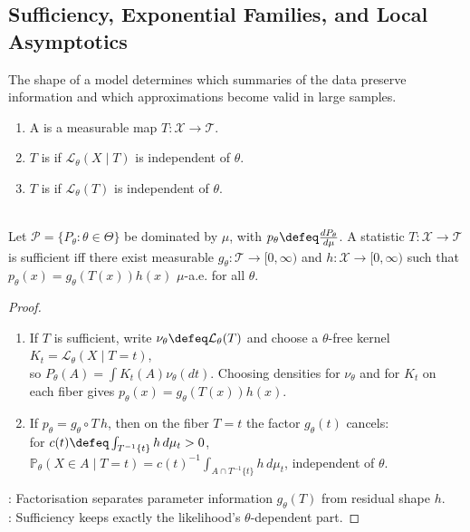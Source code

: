 \subsection{Sufficiency, Exponential Families, and Local Asymptotics}

The shape of a model determines which summaries of the data preserve information and which approximations become valid in large samples.

\begin{definition} \label{def:statistics-sufficiency-ancillarity} 
\begin{enumerate}[label=(\roman*)]
\setlength{\itemsep}{0pt}
\item A  is a measurable map $T:\mathcal{X}\to\mathcal{T}$.
\item $T$ is  if $\mathcal{L}_\theta(X\mid T)$ is independent of $\theta$.
\item $T$ is  if $\mathcal{L}_\theta(T)$ is independent of $\theta$.
\end{enumerate}
\end{definition}

\begin{theorem} \label{thm:factorization-criterion-sufficiency} \\
Let $\mathcal{P}=\{P_\theta:\theta\in\Theta\}$ be dominated by $\mu$, with $p_\theta\defeq \frac{dP_\theta}{d\mu}$. A statistic $T:\mathcal{X}\to\mathcal{T}$ is sufficient iff there exist measurable $g_\theta:\mathcal{T}\to[0,\infty)$ and $h:\mathcal{X}\to[0,\infty)$ such that $p_\theta(x)=g_\theta(T(x))h(x)$ $\mu$-a.e. for all $\theta$.
\begin{proof}
\begin{enumerate}[label=\roman*.]
\setlength{\itemsep}{0pt}
\item[$(\Rightarrow)$] If $T$ is sufficient, write $\nu_\theta\defeq\mathcal{L}_\theta(T)$ and choose a $\theta$-free kernel $K_t=\mathcal{L}_\theta(X\mid T=t)$,\\
so $P_\theta(A)=\int K_t(A)\nu_\theta(dt)$. Choosing densities for $\nu_\theta$ and for $K_t$ on each fiber gives $p_\theta(x)=g_\theta(T(x))h(x)$.
\item[$(\Leftarrow)$] If $p_\theta=g_\theta\circ T\,h$, then on the fiber $T=t$ the factor $g_\theta(t)$ cancels:\\
for $c(t)\defeq\int_{T^{-1}\{t\}}h\,d\mu_t>0$, $\mathbb{P}_\theta(X\in A\mid T=t)=c(t)^{-1}\int_{A\cap T^{-1}\{t\}}h\,d\mu_t$, independent of $\theta$.
\end{enumerate}
: Factorisation separates parameter information $g_\theta(T)$ from residual shape $h$.\\
: Sufficiency keeps exactly the likelihood's $\theta$-dependent part.
\end{proof}
\end{theorem}

